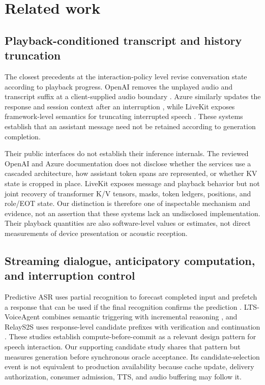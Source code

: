 \section{Related work}
\label{sec:related}

\subsection{Playback-conditioned transcript and history truncation}

The closest precedents at the interaction-policy level revise conversation state according to playback progress. OpenAI removes the unplayed audio and transcript suffix at a client-supplied audio boundary \citep{openaiRealtimeConversations}. Azure similarly updates the response and session context after an interruption \citep{microsoftVoiceLiveAutoTruncation2026}, while LiveKit exposes framework-level semantics for truncating interrupted speech \citep{livekitEventsErrorHandling}. These systems establish that an assistant message need not be retained according to generation completion.

Their public interfaces do not establish their inference internals. The reviewed OpenAI and Azure documentation does not disclose whether the services use a cascaded architecture, how assistant token spans are represented, or whether KV state is cropped in place. LiveKit exposes message and playback behavior but not joint recovery of transformer K/V tensors, masks, token ledgers, positions, and role/EOT state. Our distinction is therefore one of inspectable mechanism and evidence, not an assertion that these systems lack an undisclosed implementation. Their playback quantities are also software-level values or estimates, not direct measurements of device presentation or acoustic reception.

\subsection{Streaming dialogue, anticipatory computation, and interruption control}

Predictive ASR uses partial recognition to forecast completed input and prefetch a response that can be used if the final recognition confirms the prediction \citep{schwarz2023PersonalizedPredictiveASR}. LTS-VoiceAgent combines semantic triggering with incremental reasoning \citep{zou2026LTSVoiceAgent}, and RelayS2S uses response-level candidate prefixes with verification and continuation \citep{mai2026RelayS2S}. These studies establish compute-before-commit as a relevant design pattern for speech interaction. Our supporting candidate study shares that pattern but measures generation before synchronous oracle acceptance. Its candidate-selection event is not equivalent to production availability because cache update, delivery authorization, consumer admission, TTS, and audio buffering may follow it.


